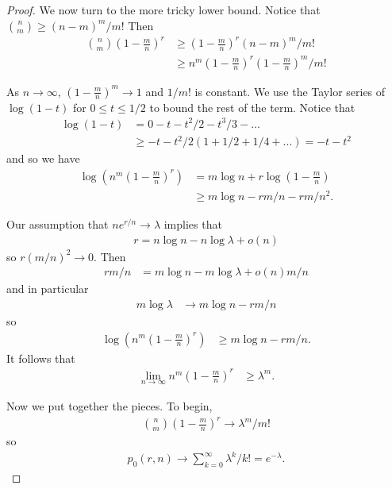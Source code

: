 \documentclass[12pt]{article}
\theoremstyle{definition}
\newcommand{\todo}[1]{{\color{blue}{[{\bf todo:} #1]}}}
\begin{document}
\begin{proof}
We now turn to the more tricky lower bound.
Notice that ${n \choose m} \geq (n-m)^m / m!$
\todo{why?}
Then
\begin{align}
{n \choose m} \left(1-\frac{m}{n}\right)^r &\geq \left(1-\frac{m}{n}\right)^r (n-m)^m / m! \nonumber\\
&\geq n^m (1 - \frac{m}{n})^r (1- \frac{m}{n})^m  / m! \nonumber
\end{align}

As $n \rightarrow \infty$, $\left(1-\frac{m}{n}\right)^m \rightarrow 1$
and $1/m!$ is constant.
We use the Taylor series of $\log(1-t)$ for $0 \leq t \leq 1/2$
to bound the rest of the term.
Notice that
\begin{align}
\log(1-t) &= 0 - t - t^2/2 -t^3/3 - ... \nonumber\\
&\geq -t -t^2/2(1 + 1/2 + 1/4 + ...) = -t - t^2 \nonumber
\end{align}
and so we have
\begin{align}
\log \left(n^m\left(1-\frac{m}{n}\right)^r \right)
&= m \log n + r \log\left(1-\frac{m}{n}\right) \nonumber \\
& \geq m \log n - r m /n - r m/n^2. \nonumber
\end{align}

\todo{why?}
Our assumption that $ne^{r/n} \rightarrow \lambda$ implies that
\begin{align}
r = n \log n - n \log \lambda + o(n) \nonumber
\end{align}
so $r(m/n)^2 \rightarrow 0$.
Then
\begin{align}
rm/n &=m \log n - m \log \lambda + o(n)m/n \nonumber
\end{align}
and in particular
\begin{align}
m \log \lambda &\rightarrow m \log n - rm/n \nonumber
\end{align}
so
\begin{align}
\log \left(n^m\left(1-\frac{m}{n}\right)^r \right)
&\geq m \log n - rm/n. \nonumber
\end{align}
It follows that
\begin{align}
\lim_{n\rightarrow \infty} n^m\left(1-\frac{m}{n}\right)^r
&\geq \lambda^m. \nonumber
\end{align}

Now we put together the pieces.
To begin,
\begin{align}
{ n \choose m } (1-\frac{m}{n})^r \rightarrow \lambda^m /m! \nonumber
\end{align}
so
\begin{align}
p_0(r,n) \rightarrow \sum_{k=0}^\infty \lambda^k /k! = e^{-\lambda}. \nonumber
\end{align}


\end{proof}
\end{document}
